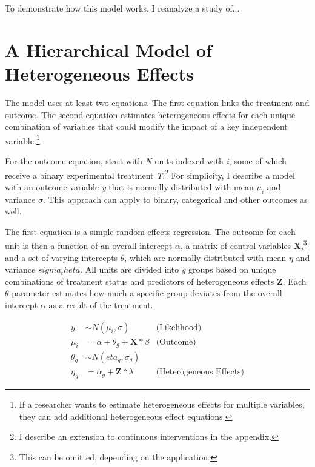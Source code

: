\documentclass[12pt]{article}
\begin{document}
% 
To demonstrate how this model works, I reanalyze a study of... 



\section{A Hierarchical Model of Heterogeneous Effects}


The model uses at least two equations. 
The first equation links the treatment and outcome. 
The second equation estimates heterogeneous effects for each unique combination of variables that could modify the impact of a key independent variable.\footnote{If a researcher wants to estimate heterogeneous effects for multiple variables, they can add additional heterogeneous effect equations.}  


For the outcome equation, start with \textit{N} units indexed with \textit{i}, some of which receive a binary experimental treatment \textit{T}.\footnote{I describe an extension to continuous interventions in the appendix.}
For simplicity, I describe a model with an outcome variable \textit{y} that is normally distributed with mean $\mu_i$ and variance $\sigma$. 
This approach can apply to binary, categorical and other outcomes as well. 


The first equation is a simple random effects regression. 
The outcome for each unit is then a function of an overall intercept $\alpha$, a matrix of control variables \textbf{X},\footnote{This can be omitted, depending on the application.} and a set of varying intercepts $\theta$, which are normally distributed with mean $\eta$ and variance $sigma_theta$. 
All units are divided into \textit{g} groups based on unique combinations of treatment status and predictors of heterogeneous effects \textbf{Z}. 
Each $\theta$ parameter estimates how much a specific group deviates from the overall intercept $\alpha$ as a result of the treatment. 


\begin{equation}
\begin{aligned}
y &\sim N(\mu_i, \sigma) &\text{(Likelihood)} \\
\mu_i &= \alpha + \theta_g + \textbf{X} * \beta &\text{(Outcome)}  \\
\theta_g &\sim N(eta_g, \sigma_\theta) \\ 
\eta_g &= \alpha_g + \textbf{Z} * \lambda &\text{(Heterogeneous Effects)} 
\end{aligned}
\end{equation}
\end{document}
